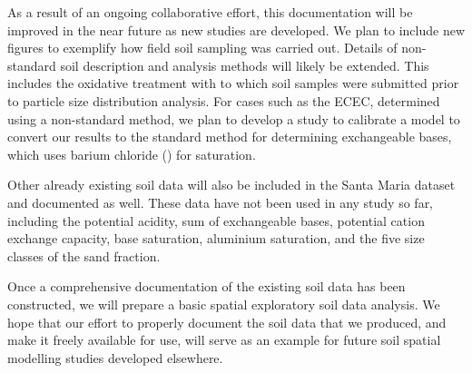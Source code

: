As a result of an ongoing collaborative effort, this documentation will be improved in the near future as new 
studies are developed. We plan to include new figures to exemplify how field soil sampling was carried out. 
Details of non-standard soil description and analysis methods will likely be extended. This includes the 
oxidative 
treatment with  to which soil samples were submitted prior to particle size distribution analysis. 
For 
cases such as the ECEC, determined using a non-standard method, we plan to develop a study to calibrate a 
model 
to convert our results to the standard method for determining exchangeable bases, which uses barium chloride 
() for saturation.

Other already existing soil data will also be included in the Santa Maria dataset and documented as well. 
These 
data have not been used in any study so far, including the potential acidity, sum of exchangeable bases, 
potential 
cation exchange capacity, base saturation, aluminium saturation, and the five size classes of the sand 
fraction.

Once a comprehensive documentation of the existing soil data has been constructed, we will prepare a basic 
spatial exploratory soil data analysis. We hope that our effort to properly document the soil data that we 
produced,
and make it freely available for use, will serve as an example for future soil spatial modelling studies 
developed 
elsewhere.

